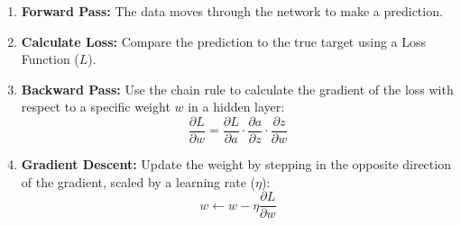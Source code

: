 \documentclass[11pt]{article}
\theoremstyle{smallexample}
\begin{document}
\begin{enumerate}
    \item \textbf{Forward Pass:} The data moves through the network to make a prediction.
    \item \textbf{Calculate Loss:} Compare the prediction to the true target using a Loss Function ($L$).
    \item \textbf{Backward Pass:} Use the chain rule to calculate the gradient of the loss with respect to a specific weight $w$ in a hidden layer:
    $$ \frac{\partial L}{\partial w} = \frac{\partial L}{\partial a} \cdot \frac{\partial a}{\partial z} \cdot \frac{\partial z}{\partial w} $$
    \item \textbf{Gradient Descent:} Update the weight by stepping in the opposite direction of the gradient, scaled by a learning rate ($\eta$):
    $$ w \leftarrow w - \eta \frac{\partial L}{\partial w} $$
\end{enumerate}
\end{document}
